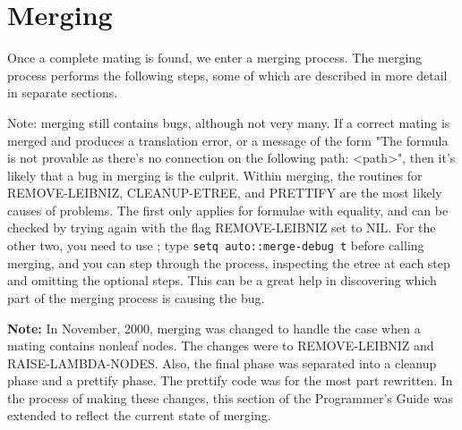 \chapter{Merging}

Once a complete mating is found, we enter a merging process.  
The merging process performs the following steps, some of which are described
in more detail in separate sections.

Note: merging still contains bugs, although not very many. If a correct mating
is merged and produces a translation error, or a message of the form "The formula is not provable
as there's no connection on the following path: <path>", then it's likely that a bug in merging is
the culprit. Within merging, the routines for REMOVE-LEIBNIZ, CLEANUP-ETREE, and PRETTIFY are the most likely 
causes of problems. The first only applies for formulae with equality, and can be checked by
trying again with the flag REMOVE-LEIBNIZ set to NIL. For the other two, you need to use ; 
type {\tt setq auto::merge-debug t} before calling merging, and you can step 
through the process, inspecting the etree at each step and omitting the optional steps. 
This can be a great help in discovering which part of the merging process is causing the bug.

{\bf Note:} In November, 2000, merging was changed to handle the case when a mating
contains nonleaf nodes.  The changes were to REMOVE-LEIBNIZ and RAISE-LAMBDA-NODES.
Also, the final phase was separated into a cleanup phase and a prettify phase.
The prettify code was for the most part rewritten.
In the process of making these changes, this section of the Programmer's Guide
was extended to reflect the current state of merging.  

